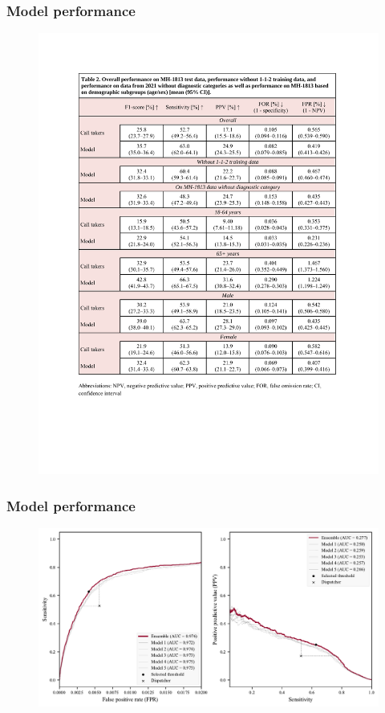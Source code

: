 \begin{frame}
    \frametitle{Model performance}
    \begin{figure}
        \centering
        \includegraphics[width=0.3\paperwidth]{../graphics/paper_retrospective/table2.pdf}
    \end{figure}
\end{frame}


\begin{frame}
    \frametitle{Model performance}
    \begin{figure}
        \centering
        \includegraphics[width=0.65\paperwidth]{../graphics/paper_retrospective/figure1.pdf}
    \end{figure}
\end{frame}


